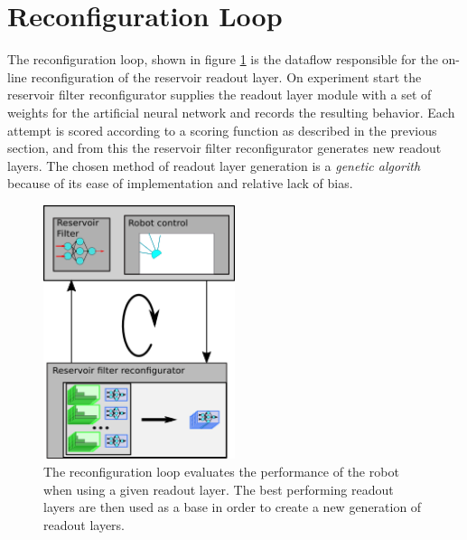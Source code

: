 \section{Reconfiguration Loop}
The reconfiguration loop, shown in figure \ref{figReconfLoop} is the dataflow
responsible for the on-line reconfiguration of the reservoir readout layer.
On experiment start the reservoir filter reconfigurator supplies the readout
layer module with a set of weights for the artificial neural network and records
the resulting behavior.
Each attempt is scored according to a scoring function as described in the
previous section, and from this the reservoir filter reconfigurator generates
new readout layers.
The chosen method of readout layer generation is a \emph{genetic algorith}
because of its ease of implementation and relative lack of bias.
\begin{figure}[h!]
  \centering
  \includegraphics[width=0.5\textwidth]{fig/reconfigLoop.png}
  \caption{
    The reconfiguration loop evaluates the performance of the robot when using a
    given readout layer.
    The best performing readout layers are then used as a base in order to
    create a new generation of readout layers.
  }
  \label{figReconfLoop}
\end{figure}
\cleardoublepage

